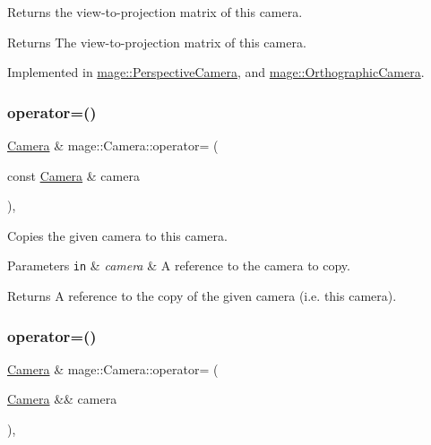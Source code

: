 Returns the view-\/to-\/projection matrix of this camera.

\begin{DoxyReturn}{Returns}
The view-\/to-\/projection matrix of this camera. 
\end{DoxyReturn}


Implemented in \hyperlink{classmage_1_1_perspective_camera_a10348ff23fab164566ffb223a75bf745}{mage\+::\+Perspective\+Camera}, and \hyperlink{classmage_1_1_orthographic_camera_a9ba51750d26d91fa094d82f875c7f1e5}{mage\+::\+Orthographic\+Camera}.

\hypertarget{classmage_1_1_camera_a785b5e3a62922f7a687ffcaecd0ef89c}{}\label{classmage_1_1_camera_a785b5e3a62922f7a687ffcaecd0ef89c} 
\subsubsection{\texorpdfstring{operator=()}{operator=()}\hspace{0.1cm}{\footnotesize\ttfamily [1/2]}}
{\footnotesize\ttfamily \hyperlink{classmage_1_1_camera}{Camera} \& mage\+::\+Camera\+::operator= (\begin{DoxyParamCaption}\item[{const \hyperlink{classmage_1_1_camera}{Camera} \&}]{camera }\end{DoxyParamCaption})\hspace{0.3cm}{\ttfamily [default]}, {\ttfamily [noexcept]}}

Copies the given camera to this camera.


\begin{DoxyParams}[1]{Parameters}
\mbox{\tt in}  & {\em camera} & A reference to the camera to copy. \\
\hline
\end{DoxyParams}
\begin{DoxyReturn}{Returns}
A reference to the copy of the given camera (i.\+e. this camera). 
\end{DoxyReturn}
\hypertarget{classmage_1_1_camera_ac52101822e004915a96150305564a6bf}{}\label{classmage_1_1_camera_ac52101822e004915a96150305564a6bf} 
\subsubsection{\texorpdfstring{operator=()}{operator=()}\hspace{0.1cm}{\footnotesize\ttfamily [2/2]}}
{\footnotesize\ttfamily \hyperlink{classmage_1_1_camera}{Camera} \& mage\+::\+Camera\+::operator= (\begin{DoxyParamCaption}\item[{\hyperlink{classmage_1_1_camera}{Camera} \&\&}]{camera }\end{DoxyParamCaption})\hspace{0.3cm}{\ttfamily [default]}, {\ttfamily [noexcept]}}

